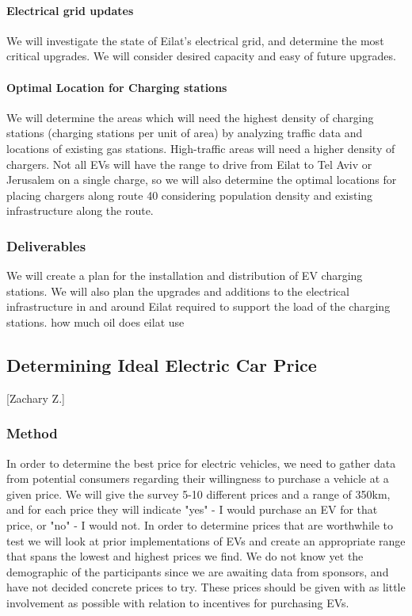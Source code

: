 \documentclass{article}                         %
\begin{document}
\paragraph{Electrical grid updates}
We will investigate the state of Eilat's electrical grid, and determine the most critical upgrades. We will consider desired capacity and easy of future upgrades.

\paragraph{Optimal Location for Charging stations}
We will determine the areas which will need the highest density of charging stations (charging stations per unit of area) by analyzing traffic data and locations of existing gas stations. High-traffic areas will need a higher density of chargers. Not all EVs will have the range to drive from Eilat to Tel Aviv or Jerusalem on a single charge, so we will also determine the optimal locations for placing chargers along route 40 considering population density and existing infrastructure along the route.

\subsubsection{Deliverables}
We will create a plan for the installation and distribution of EV charging stations. We will also plan the upgrades and additions to the electrical infrastructure in and around Eilat required to support the load of the charging stations.
how much oil does eilat use
\subsection{Determining Ideal Electric Car Price}[Zachary Z.]

\subsubsection{Method}
In order to determine the best price for electric vehicles, we need to gather data from potential consumers regarding their willingness to purchase a vehicle at a given price. We will give the survey 5-10 different prices and a range of 350km, and for each price they will indicate "yes" - I would purchase an EV for that price, or "no" - I would not.  In order to determine prices that are worthwhile to test we will look at prior implementations of EVs and create an appropriate range that spans the lowest and highest prices we find. We do not know yet the demographic of the participants since we are awaiting data from sponsors, and have not decided concrete prices to try. These prices should be given with as little involvement as possible with relation to incentives for purchasing EVs.
\end{document}
